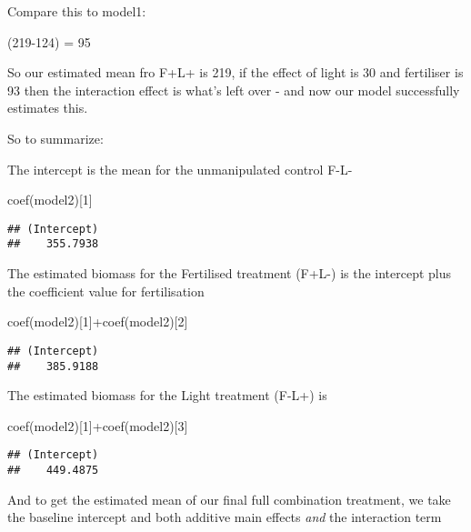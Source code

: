 \documentclass[
]{article}
\newenvironment{Shaded}{\begin{snugshade}}{\end{snugshade}}
\newcommand{\DecValTok}[1]{\textcolor[rgb]{0.00,0.00,0.81}{#1}}
\newcommand{\FunctionTok}[1]{\textcolor[rgb]{0.00,0.00,0.00}{#1}}
\newcommand{\NormalTok}[1]{#1}
\newcommand{\SpecialCharTok}[1]{\textcolor[rgb]{0.00,0.00,0.00}{#1}}
\begin{document}
Compare this to model1:

(219-124) = 95

So our estimated mean fro F+L+ is 219, if the effect of light is 30 and
fertiliser is 93 then the interaction effect is what's left over - and
now our model successfully estimates this.

So to summarize:

The intercept is the mean for the unmanipulated control F-L-

\begin{Shaded}
\begin{Highlighting}[]
\FunctionTok{coef}\NormalTok{(model2)[}\DecValTok{1}\NormalTok{]}
\end{Highlighting}
\end{Shaded}

\begin{verbatim}
## (Intercept) 
##    355.7938
\end{verbatim}

The estimated biomass for the Fertilised treatment (F+L-) is the
intercept plus the coefficient value for fertilisation

\begin{Shaded}
\begin{Highlighting}[]
\FunctionTok{coef}\NormalTok{(model2)[}\DecValTok{1}\NormalTok{]}\SpecialCharTok{+}\FunctionTok{coef}\NormalTok{(model2)[}\DecValTok{2}\NormalTok{]}
\end{Highlighting}
\end{Shaded}

\begin{verbatim}
## (Intercept) 
##    385.9188
\end{verbatim}

The estimated biomass for the Light treatment (F-L+) is

\begin{Shaded}
\begin{Highlighting}[]
\FunctionTok{coef}\NormalTok{(model2)[}\DecValTok{1}\NormalTok{]}\SpecialCharTok{+}\FunctionTok{coef}\NormalTok{(model2)[}\DecValTok{3}\NormalTok{]}
\end{Highlighting}
\end{Shaded}

\begin{verbatim}
## (Intercept) 
##    449.4875
\end{verbatim}

And to get the estimated mean of our final full combination treatment,
we take the baseline intercept and both additive main effects \emph{and}
the interaction term
\end{document}
